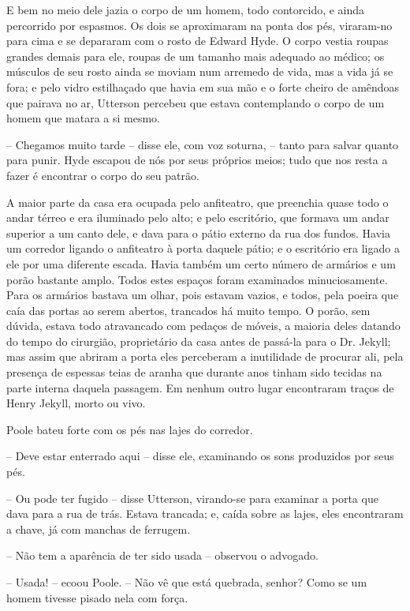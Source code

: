 E bem no meio dele jazia o corpo de um homem, todo contorcido, e ainda
percorrido por espasmos.  Os dois se aproximaram na ponta dos pés,
viraram-no para cima e se depararam com o rosto de Edward Hyde.  O
corpo vestia roupas grandes demais para ele, roupas de um tamanho mais
adequado ao médico; os músculos de seu rosto ainda se moviam num
arremedo de vida, mas a vida já se fora; e pelo vidro estilhaçado que
havia em sua mão e o forte cheiro de amêndoas que pairava no ar,
Utterson percebeu que estava contemplando o corpo de um homem que
matara a si mesmo.

-- Chegamos muito tarde -- disse ele, com voz soturna, -- tanto para
salvar quanto para punir.  Hyde escapou de nós por seus próprios meios;
tudo que nos resta a fazer é encontrar o corpo do seu patrão.

A maior parte da casa era ocupada pelo anfiteatro, que preenchia quase
todo o andar térreo e era iluminado pelo alto; e pelo escritório, que
formava um andar superior a um canto dele, e dava para o pátio externo
da rua dos fundos.  Havia um corredor ligando o anfiteatro à porta
daquele pátio; e o escritório era ligado a ele por uma diferente
escada.  Havia também um certo número de armários e um porão bastante
amplo. Todos estes espaços foram examinados minuciosamente.  Para os
armários bastava um olhar, pois estavam vazios, e todos, pela poeira
que caía das portas ao serem abertos, trancados há muito tempo.  O
porão, sem dúvida, estava todo atravancado com pedaços de móveis, a
maioria deles datando do tempo do cirurgião, proprietário da casa antes
de passá-la para o Dr. Jekyll; mas assim que abriram a porta eles
perceberam a inutilidade de procurar ali, pela presença de espessas
teias de aranha que durante anos tinham sido tecidas na parte interna
daquela passagem.  Em nenhum outro lugar encontraram traços de Henry
Jekyll, morto ou vivo.

Poole bateu forte com os pés nas lajes do corredor.

-- Deve estar enterrado aqui -- disse ele, examinando os sons produzidos
por seus pés.

-- Ou pode ter fugido -- disse Utterson, virando-se para examinar a porta
que dava para a rua de trás.  Estava trancada; e, caída sobre as lajes,
eles encontraram a chave, já com manchas de ferrugem.

-- Não tem a aparência de ter sido usada -- observou o advogado.

-- Usada! -- ecoou Poole. -- Não vê que está quebrada, senhor?  Como se
um homem tivesse pisado nela com força.

